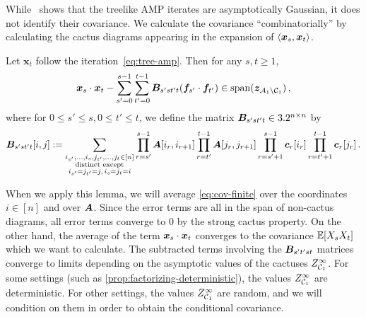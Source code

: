 While~ shows that the treelike AMP iterates are
asymptotically Gaussian, it does not identify their covariance. We calculate the covariance ``combinatorially'' by calculating the cactus diagrams appearing in
the expansion of $\langle {\bm x}_s, {\bm x}_t\rangle$.


\begin{proposition}\label{lem:cov-cactus}
    Let $\bm x_t$ follow the iteration~\cref{eq:tree-amp}. Then for any $s,t\ge 1$,
    \begin{equation}\label{eq:cov-finite}
        \bm x_s \cdot \bm x_t - \sum_{s'=0}^{s-1} \sum_{t'=0}^{t-1} \bm B_{s'st't} (\bm f_{s'} \cdot \bm f_{t'}) \in \operatorname{span}(\bm z_{{\cal A}_1\setminus {\cal C}_1})\,,
    \end{equation}
    where for $0\le s'\le s, 0\le t'\le t$, we define the matrix ${\bm B}_{s'st't} \in 3.2^{n\times n}$ by
    \begin{equation*}
        \bm B_{s'st't}[i,j] := \sum_{\substack{i_{s'},\ldots,i_{s}, j_{t'}, \ldots, j_{t}\in [n]\\
        \textnormal{distinct except}\\
        i_{s'}=j_{t'}=j,\, i_s=j_t=i}} \prod_{r=s'}^{s-1} \bm A[i_r,i_{r+1}] \prod_{r=t'}^{t-1} \bm A[j_r,j_{r+1}] \prod_{r=s'+1}^{s-1} \bm c_r[i_r] \prod_{r=t'+1}^{t-1} \bm c_r[j_r]\,.
    \end{equation*}
\end{proposition}


When we apply this lemma, we will average \cref{eq:cov-finite}
over the coordinates $i \in [n]$ and over ${\bm A}$.
Since the error terms are all in the span of non-cactus diagrams,
all error terms converge to 0 by the strong cactus property.
On the other hand,
the average of the term ${\bm x}_s \cdot {\bm x}_t$ converges to the covariance $\operatorname*{\mathbb{E}}[X_sX_t]$
which we want to calculate.
The subtracted terms involving the ${\bm B}_{s't'st}$ matrices converge to limits depending on the asymptotic values of the cactuses $Z_{{\cal C}_1}^\infty$.
For some settings (such as \cref{prop:factorizing-deterministic}), the values $Z_{{\cal C}_1}^\infty$ are deterministic.
For other settings, the values $Z_{{\cal C}_1}^\infty$ are random, and we will condition on them in order to obtain the conditional covariance.


